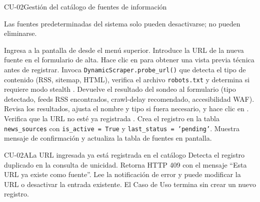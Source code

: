 \begin{UseCase}{CU-02}{Gestión del catálogo de fuentes de información}
{\begin{Titemize}
		\Titem Las fuentes predeterminadas del sistema solo pueden desactivarse; no pueden eliminarse.
	\end{Titemize}
	}
\end{UseCase}

\begin{UCtrayectoria}
	\UCpaso[\UCActor] Ingresa a la pantalla de  desde el menú superior.
	\UCpaso[\UCActor] Introduce la URL de la nueva fuente en el formulario de alta.
	\UCpaso[\UCActor] Hace clic en  para obtener una vista previa técnica antes de registrar.
	\UCpaso[\UCsist] Invoca \texttt{DynamicScraper.probe\_url()} que detecta el tipo de contenido (RSS, sitemap, HTML), verifica el archivo \texttt{robots.txt} y determina si requiere modo stealth .
	\UCpaso[\UCsist] Devuelve el resultado del sondeo al formulario (tipo detectado, feeds RSS encontrados, crawl-delay recomendado, accesibilidad WAF).
	\UCpaso[\UCActor] Revisa los resultados, ajusta el nombre y tipo si fuera necesario, y hace clic en .
	\UCpaso[\UCsist] Verifica que la URL no esté ya registrada .
	\UCpaso[\UCsist] Crea el registro en la tabla \texttt{news\_sources} con \texttt{is\_active = True} y \texttt{last\_status = 'pending'}.
	\UCpaso[\UCsist] Muestra mensaje de confirmación y actualiza la tabla de fuentes en pantalla.
\end{UCtrayectoria}

\begin{UCtrayectoriaA}{CU-02}{A}{La URL ingresada ya está registrada en el catálogo}
	\UCpaso[\UCsist] Detecta el registro duplicado en la consulta de unicidad.
	\UCpaso[\UCsist] Retorna HTTP 409 con el mensaje ``Esta URL ya existe como fuente''.
	\UCpaso[\UCActor] Lee la notificación de error y puede modificar la URL o desactivar la entrada existente.
	\UCpaso[] El Caso de Uso termina sin crear un nuevo registro.
\end{UCtrayectoriaA}


